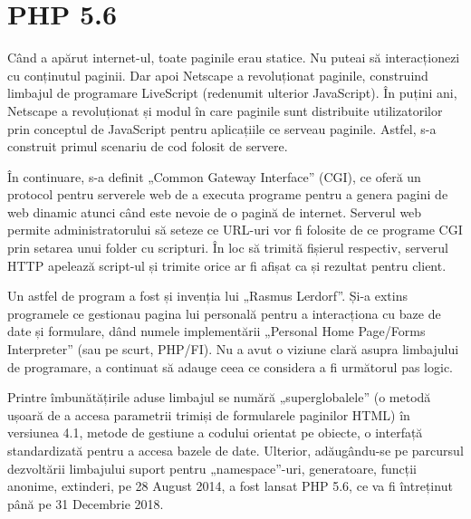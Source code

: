 \section{PHP 5.6}
	Când a apărut internet-ul, toate paginile erau statice. Nu puteai să interacționezi cu conținutul paginii. Dar apoi Netscape a revoluționat paginile, construind limbajul de programare LiveScript (redenumit ulterior JavaScript). 
	În puțini ani, Netscape a revoluționat și modul în care paginile sunt distribuite utilizatorilor prin conceptul de JavaScript pentru aplicațiile ce serveau paginile. 
	Astfel, s-a construit primul scenariu de cod folosit de servere. \cite{TheInformationRevolution}

	În continuare, s-a definit „Common Gateway Interface” (CGI), ce oferă un protocol pentru serverele web de a executa programe pentru a genera pagini de web dinamic atunci când este nevoie de o pagină de internet. 
	Serverul web permite administratorului să seteze ce URL-uri vor fi folosite de ce programe CGI prin setarea unui folder cu scripturi. 
	În loc să trimită fișierul respectiv, serverul HTTP apelează script-ul și trimite orice ar fi afișat ca și rezultat pentru client. \cite{cgi}

	Un astfel de program a fost și invenția lui „Rasmus Lerdorf”.
	Și-a extins programele ce gestionau pagina lui personală pentru a interacționa cu baze de date și formulare, dând numele implementării „Personal Home Page/Forms Interpreter” (sau pe scurt, PHP/FI). 
	Nu a avut o viziune clară asupra limbajului de programare, a continuat să adauge ceea ce considera a fi următorul pas logic. \cite{php_code}

	Printre îmbunătățirile aduse limbajul se numără „superglobalele” (o metodă ușoară de a accesa parametrii trimiși de formularele paginilor HTML) în versiunea 4.1, metode de gestiune a codului orientat pe obiecte, o interfață standardizată pentru a accesa bazele de date.
	Ulterior, adăugându-se pe parcursul dezvoltării limbajului suport pentru „namespace”-uri, generatoare, funcții anonime, extinderi, pe 28 August 2014, a fost lansat PHP 5.6, ce va fi întreținut până pe 31 Decembrie 2018. \cite{php_supported_versions}
